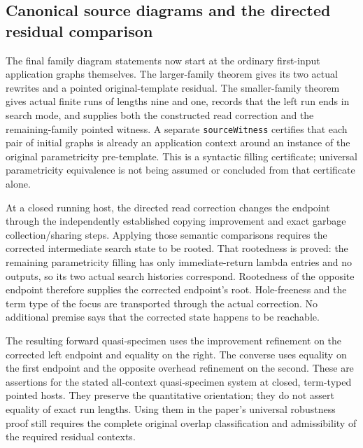 \subsection{Canonical source diagrams and the directed residual comparison}
The final family diagram statements now start at the ordinary first-input
application graphs themselves. The larger-family theorem gives its two
actual rewrites and a pointed original-template residual. The smaller-family
theorem gives actual finite runs of lengths nine and one, records that the
left run ends in search mode, and supplies both the constructed read
correction and the remaining-family pointed witness. A separate
\texttt{sourceWitness} certifies that each pair of initial graphs is already
an application context around an instance of the original parametricity
pre-template. This is a syntactic filling certificate; universal
parametricity equivalence is not being assumed or concluded from that
certificate alone.

\par{}
\par{}
\par{}

At a closed running host, the directed read correction changes the endpoint
through the independently established copying improvement and exact garbage
collection/sharing steps. Applying those semantic comparisons requires the
corrected intermediate search state to be rooted. That rootedness is proved:
the remaining parametricity filling has only immediate-return lambda entries
and no outputs, so its two actual search histories correspond. Rootedness
of the opposite endpoint therefore supplies the corrected endpoint's root.
Hole-freeness and the term type of the focus are transported through the
actual correction. No additional premise says that the corrected state
happens to be reachable.

The resulting forward quasi-specimen uses the improvement refinement on the
corrected left endpoint and equality on the right. The converse uses equality
on the first endpoint and the opposite overhead refinement on the second.
These are assertions for the stated all-context quasi-specimen system at
closed, term-typed pointed hosts. They preserve the quantitative orientation;
they do not assert equality of exact run lengths. Using them in the paper's
universal robustness proof still requires the complete original
overlap classification and admissibility of the required residual contexts.

